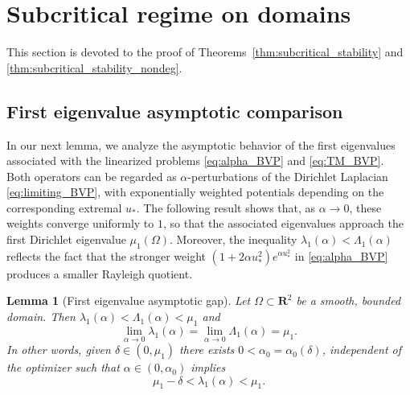\documentclass[reqno,11pt]{amsart}
\newtheorem{lemma}[theorem]{Lemma}
\theoremstyle{definition}
\begin{document}
\section{Subcritical regime on domains}\label{sec:subcritical_regime}
This section is devoted to the proof of Theorems~\ref{thm:subcritical_stability} and \ref{thm:subcritical_stability_nondeg}.

\subsection{First eigenvalue asymptotic comparison}\label{subsec:first_eigenvalue}
In our next lemma, we analyze the asymptotic behavior of the first eigenvalues associated with the linearized problems \eqref{eq:alpha_BVP} and \eqref{eq:TM_BVP}.  
Both operators can be regarded as $\alpha$-perturbations of the Dirichlet Laplacian \eqref{eq:limiting_BVP}, with exponentially weighted potentials depending on the corresponding extremal $u_*$.  
The following result shows that, as $\alpha\to0$, these weights converge uniformly to $1$, so that the associated eigenvalues approach the first Dirichlet eigenvalue $\mu_1(\Omega)$.  
Moreover, the inequality $\lambda_1(\alpha)<\Lambda_1(\alpha)$ reflects the fact that the stronger weight $(1+2\alpha u_*^2)e^{\alpha u_*^2}$ in \eqref{eq:alpha_BVP} produces a smaller Rayleigh quotient.


    
    \begin{lemma}[First eigenvalue asymptotic gap]\label{lm:eigenvalue_convergence}
        Let $\Omega\subset\mathbf{R}^2$ be a smooth, bounded domain.
        Then $\lambda_1(\alpha)<\Lambda_1(\alpha)<\mu_1$
         and
         \[
            \lim_{\alpha\to 0}\lambda_1(\alpha)=\lim_{\alpha\to 0}\Lambda_1(\alpha)=\mu_1.
        \]
        In other words, given $\delta\in(0,\mu_1)$ there exists $0<\alpha_0=\alpha_0(\delta)$, 
        independent of the optimizer such that $\alpha\in(0,\alpha_0)$ implies
    \begin{equation*} 
    \mu_1-\delta < \lambda_1(\alpha) < \mu_1. 
    \end{equation*} 
    \end{lemma}
\end{document}
